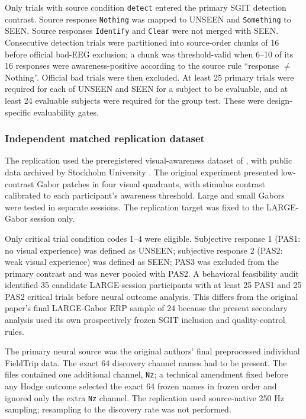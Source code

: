 \documentclass[12pt]{article}
\begin{document}
Only trials with source condition \texttt{detect} entered the primary SGIT detection contrast. Source response \texttt{Nothing} was mapped to UNSEEN and \texttt{Something} to SEEN. Source responses \texttt{Identify} and \texttt{Clear} were not merged with SEEN. Consecutive detection trials were partitioned into source-order chunks of 16 before official bad-EEG exclusion; a chunk was threshold-valid when 6--10 of its 16 responses were awareness-positive according to the source rule ``response $\ne$ Nothing''. Official bad trials were then excluded. At least 25 primary trials were required for each of UNSEEN and SEEN for a subject to be evaluable, and at least 24 evaluable subjects were required for the group test. These were design-specific evaluability gates.

\subsubsection{Independent matched replication dataset}
The replication used the preregistered visual-awareness dataset of \citet{EklundWiens2018}, with public data archived by Stockholm University \citep{EklundWiensData2018}. The original experiment presented low-contrast Gabor patches in four visual quadrants, with stimulus contrast calibrated to each participant's awareness threshold. Large and small Gabors were tested in separate sessions. The replication target was fixed to the LARGE-Gabor session only.

Only critical trial condition codes 1--4 were eligible. Subjective response 1 (PAS1: no visual experience) was defined as UNSEEN; subjective response 2 (PAS2: weak visual experience) was defined as SEEN; PAS3 was excluded from the primary contrast and was never pooled with PAS2. A behavioral feasibility audit identified 35 candidate LARGE-session participants with at least 25 PAS1 and 25 PAS2 critical trials before neural outcome analysis. This differs from the original paper's final LARGE-Gabor ERP sample of 24 because the present secondary analysis used its own prospectively frozen SGIT inclusion and quality-control rules.

The primary neural source was the original authors' final preprocessed individual FieldTrip data. The exact 64 discovery channel names had to be present. The files contained one additional channel, \texttt{Nz}; a technical amendment fixed before any Hodge outcome selected the exact 64 frozen names in frozen order and ignored only the extra \texttt{Nz} channel. The replication used source-native 250 Hz sampling; resampling to the discovery rate was not performed.
\end{document}

